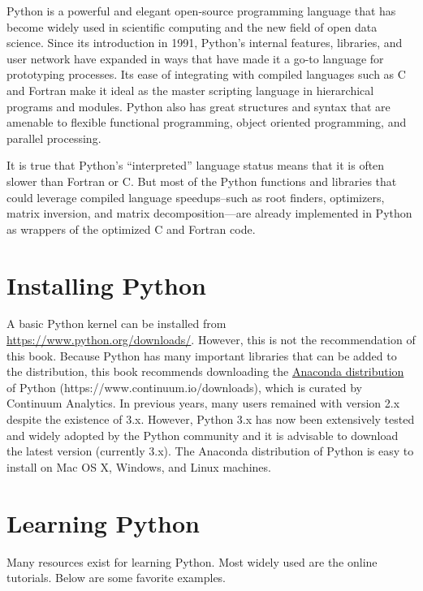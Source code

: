 
Python is a powerful and elegant open-source programming language that has become widely used in scientific computing and the new field of open data science. Since its introduction in 1991, Python's internal features, libraries, and user network have expanded in ways that have made it a go-to language for prototyping processes. Its ease of integrating with compiled languages such as C and Fortran make it ideal as the master scripting language in hierarchical programs and modules. Python also has great structures and syntax that are amenable to flexible functional programming, object oriented programming, and parallel processing.

It is true that Python's ``interpreted'' language status means that it is often slower than Fortran or C. But most of the Python functions and libraries that could leverage compiled language speedups--such as root finders, optimizers, matrix inversion, and matrix decomposition---are already implemented in Python as wrappers of the optimized C and Fortran code.


\section{Installing Python}\label{SecPythonInstall}

  A basic Python kernel can be installed from \href{https://www.python.org/downloads/}{https://www.python.org/downloads/}. However, this is not the recommendation of this book. Because Python has many important libraries that can be added to the distribution, this book recommends downloading the \href{https://www.continuum.io/downloads}{Anaconda distribution} of Python (https://www.continuum.io/downloads), which is curated by Continuum Analytics. In previous years, many users remained with version 2.x despite the existence of 3.x. However, Python 3.x has now been extensively tested and widely adopted by the Python community and it is advisable to download the latest version (currently 3.x). The Anaconda distribution of Python is easy to install on Mac OS X, Windows, and Linux machines.


\section{Learning Python}\label{SecPythonLearning}

  Many resources exist for learning Python. Most widely used are the online tutorials. Below are some favorite examples.

